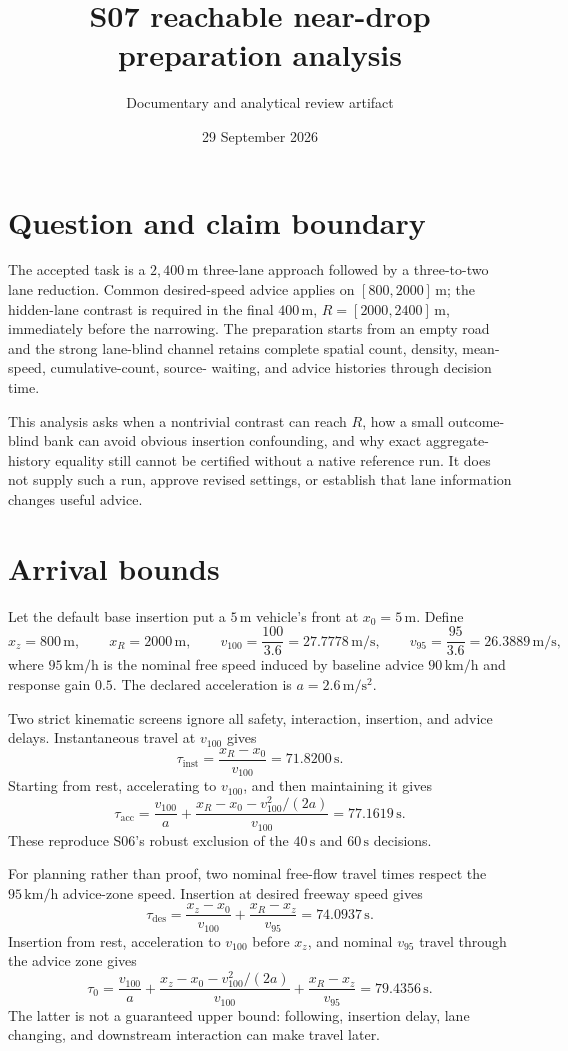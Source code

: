 \documentclass[11pt]{article}
\title{S07 reachable near-drop preparation analysis}
\author{Documentary and analytical review artifact}
\date{29 September 2026}
\newcommand{\unit}[1]{\,\mathrm{#1}}
\begin{document}
\maketitle

\section{Question and claim boundary}

The accepted task is a $2{,}400\unit{m}$ three-lane approach followed by a
three-to-two lane reduction.  Common desired-speed advice applies on
$[800,2000]\unit{m}$; the hidden-lane contrast is required in the final
$400\unit{m}$, $R=[2000,2400]\unit{m}$, immediately before the narrowing.
The preparation starts from an empty road and the strong lane-blind channel
retains complete spatial count, density, mean-speed, cumulative-count, source-
waiting, and advice histories through decision time.

This analysis asks when a nontrivial contrast can reach $R$, how a small
outcome-blind bank can avoid obvious insertion confounding, and why exact
aggregate-history equality still cannot be certified without a native reference
run.  It does not supply such a run, approve revised settings, or establish that
lane information changes useful advice.

\section{Arrival bounds}

Let the default base insertion put a $5\unit{m}$ vehicle's front at
$x_0=5\unit{m}$.  Define
\[
x_z=800\unit{m},\qquad x_R=2000\unit{m},\qquad
v_{100}=\frac{100}{3.6}=27.7778\unit{m/s},\qquad
v_{95}=\frac{95}{3.6}=26.3889\unit{m/s},
\]
where $95\unit{km/h}$ is the nominal free speed induced by baseline advice
$90\unit{km/h}$ and response gain $0.5$.  The declared acceleration is
$a=2.6\unit{m/s^2}$.

Two strict kinematic screens ignore all safety, interaction, insertion, and
advice delays.  Instantaneous travel at $v_{100}$ gives
\[
\tau_{\mathrm{inst}}=\frac{x_R-x_0}{v_{100}}=71.8200\unit{s}.
\]
Starting from rest, accelerating to $v_{100}$, and then maintaining it gives
\[
\tau_{\mathrm{acc}}=\frac{v_{100}}{a}+
\frac{x_R-x_0-v_{100}^2/(2a)}{v_{100}}
=77.1619\unit{s}.
\]
These reproduce S06's robust exclusion of the $40\unit{s}$ and $60\unit{s}$
decisions.

For planning rather than proof, two nominal free-flow travel times respect the
$95\unit{km/h}$ advice-zone speed.  Insertion at desired freeway speed gives
\[
\tau_{\mathrm{des}}=
\frac{x_z-x_0}{v_{100}}+\frac{x_R-x_z}{v_{95}}
=74.0937\unit{s}.
\]
Insertion from rest, acceleration to $v_{100}$ before $x_z$, and nominal
$v_{95}$ travel through the advice zone gives
\[
\tau_0=\frac{v_{100}}{a}+
\frac{x_z-x_0-v_{100}^2/(2a)}{v_{100}}
+\frac{x_R-x_z}{v_{95}}=79.4356\unit{s}.
\]
The latter is not a guaranteed upper bound: following, insertion delay, lane
changing, and downstream interaction can make travel later.
\end{document}
